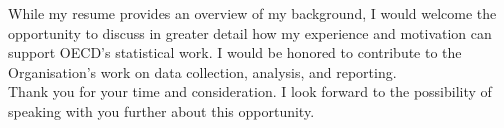 \documentclass[11pt,a4paper,roman]{moderncv}
\begin{document}
\vspace{1em}
While my resume provides an overview of my background, I would welcome the opportunity to discuss in greater detail how my experience and motivation can support OECD's statistical work. I would be honored to contribute to the Organisation's work on data collection, analysis, and reporting.\\

\vspace{1em}
Thank you for your time and consideration. I look forward to the possibility of speaking with you further about this opportunity.

\vspace{0.5cm}


\makeletterclosing
\end{document}
